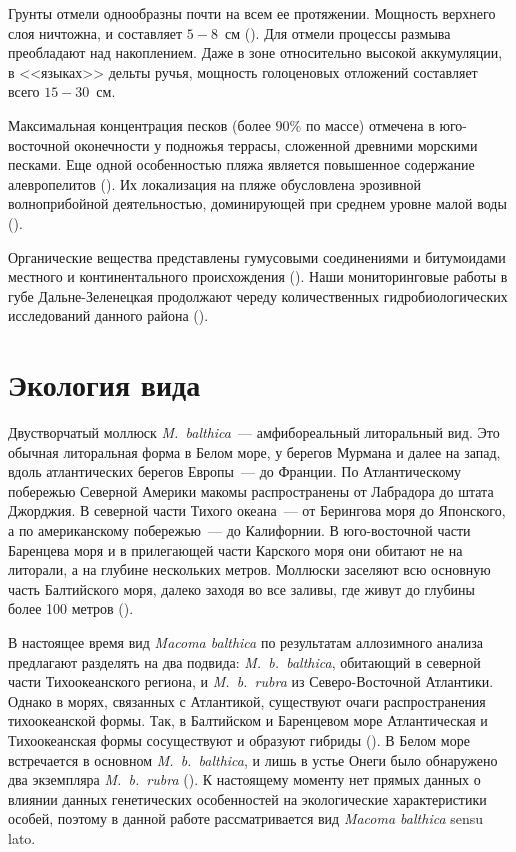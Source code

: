 Грунты отмели однообразны почти на всем ее протяжении. 
Мощность верхнего слоя ничтожна, и составляет $5 - 8$~см (\cite{Prigorovskiy_1948}). 
Для отмели процессы размыва преобладают над накоплением. 
Даже в зоне относительно высокой аккумуляции, в <<языках>> дельты ручья, мощность голоценовых отложений составляет всего $15 - 30$~см.

Максимальная концентрация песков (более $90$\% по массе) отмечена в юго-восточной оконечности у подножья террасы, сложенной древними морскими песками. Еще одной особенностью пляжа является повышенное содержание алевропелитов (\cite{Pavlova_1976}). 
Их локализация на пляже обусловлена эрозивной волноприбойной деятельностью, доминирующей при среднем уровне малой воды (\cite{Alexeev_1976}).

Органические вещества представлены гумусовыми соединениями и битумоидами местного и континентального происхождения (\cite{Gurevich_Yakovleva_1976}).
Наши мониторинговые работы в губе Дальне-Зеленецкая продолжают череду количественных гидробиологических исследований данного района (\cite{Prigorovskiy_1948, Matveeva_et_al_1955, Streltsov_et_al_1974, Agarova_et_al_1976, Zhukov_1984, Strelkov_et_al_2001}).


		\section{Экология вида}
Двустворчатый моллюск \textit{M.~balthica}~--- амфибореальный литоральный вид.
Это обычная литоральная форма в Белом море, у берегов Мурмана и далее на запад, вдоль атлантических берегов Европы~--- до Франции. 
По Атлантическому побережью Северной Америки макомы распространены от Лабрадора до штата Джорджия. 
В северной части Тихого океана~--- от Берингова моря до Японского, а по американскому побережью~--- до Калифорнии. 
В юго-восточной части Баренцева моря и в прилегающей части Карского моря они обитают  не на литорали, а на глубине нескольких метров. 
Моллюски заселяют всю основную часть Балтийского моря, далеко заходя во все заливы, где живут до глубины более 100 метров (\cite{Zacepin_Filatova_1968}).

В настоящее время вид {\it Macoma balthica} по результатам аллозимного анализа предлагают разделять на два подвида: {\it M.~b.~balthica}, обитающий в северной части Тихоокеанского региона, и {\it M.~b.~rubra} из Северо-Восточной Атлантики. 
Однако  в морях, связанных с  Атлантикой, существуют очаги распространения тихоокеанской формы. 
Так, в Балтийском и Баренцевом море Атлантическая и Тихоокеанская формы сосуществуют и образуют гибриды (\cite{Vainola_2003}). 
В Белом море встречается в основном {\it M.~b.~balthica}, и лишь в устье Онеги было обнаружено два экземпляра {\it M.~b.~rubra} (\cite{Nikula_et_al_2007}).
К настоящему моменту нет прямых данных о влиянии данных генетических особенностей на экологические характеристики особей, поэтому в данной работе рассматривается вид {\it Macoma balthica} sensu lato.

